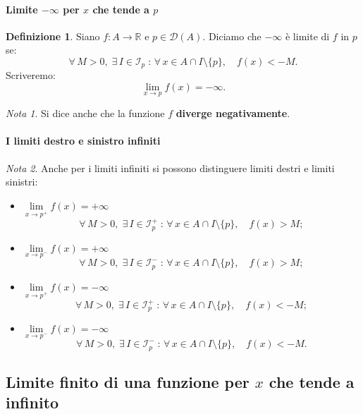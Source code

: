 \documentclass{article}
\theoremstyle{plain}
\theoremstyle{definition}
\newtheorem{defn}{Definizione}[section]
\theoremstyle{remark}
\newtheorem{note}{Nota}
\begin{document}
\vspace{10pt}

\paragraph{Limite $-\infty$ per $x$ che tende a $p$}
\begin{bxthm}
\begin{defn}
    Siano $f:A\to\mathbb{R}$ e $p\in\mathcal{D}(A)$.
    Diciamo che $-\infty$ è limite di $f$ in $p$ se:
    \[\forall\, M>0,\;\exists\,I\in\mathcal{I}_{p}\;:\,\forall\, x\in A\cap I\setminus\{p\},\quad f(x)<-M.\]
    Scriveremo:
    \[\lim_{x\to p}f(x)=-\infty.\] 
\end{defn}
\end{bxthm}
\begin{note}
    Si dice anche che la funzione $f$ \textbf{diverge negativamente}.
\end{note}

\vspace{10pt}

\paragraph{I limiti destro e sinistro infiniti}
\begin{note}
    Anche per i limiti infiniti si possono distinguere limiti destri e limiti sinistri:
\begin{itemize}
    \item $\lim\limits_{x\to p^+}f(x)=+\infty$
    \[\forall\, M>0,\;\exists\,I\in\mathcal{I}^+_{p}\;:\,\forall\, x\in A\cap I\setminus\{p\},\quad f(x)>M;\]
    \item $\lim\limits_{x\to p^-}f(x)=+\infty$
    \[\forall\, M>0,\;\exists\,I\in\mathcal{I}^-_{p}\;:\,\forall\, x\in A\cap I\setminus\{p\},\quad f(x)>M;\]
    \item $\lim\limits_{x\to p^+}f(x)=-\infty$
    \[\forall\, M>0,\;\exists\,I\in\mathcal{I}^+_{p}\;:\,\forall\, x\in A\cap I\setminus\{p\},\quad f(x)<-M;\]
    \item $\lim\limits_{x\to p^-}f(x)=-\infty$
    \[\forall\, M>0,\;\exists\,I\in\mathcal{I}^-_{p}\;:\,\forall\, x\in A\cap I\setminus\{p\},\quad f(x)<-M.\]
\end{itemize}
\end{note}

\vspace{20pt}

\subsection{Limite finito di una funzione per $x$ che tende a infinito}
\end{document}
